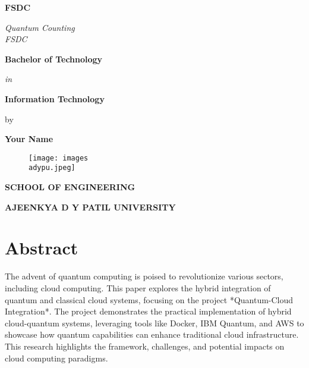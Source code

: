 \documentclass[12pt,a4paper]{article}
\newcommand{\mydegree}{Bachelor of Technology} %
\newcommand{\degreename}{Information Technology} %
\newcommand{\mysupervisor}{Your Name} %
\newcommand{\mydep}{School of Engineering}
\begin{document}
\thispagestyle{empty}
\begin{center}
    {\large {\bfseries FSDC} \par}
    \vspace{3\baselineskip}
    {\textit{Quantum Counting}\\
    \textit{FSDC}}\par
    \vspace{\baselineskip}
    {\large \bf \mydegree \par} 
    \vspace{\baselineskip}
    {\textit{in} \par}
    \vspace{\baselineskip}
    {{\large {\bf \degreename \\ }} \par}
    \vspace{1.5\baselineskip}
    {by \par}
    \vspace{\baselineskip}
    {{\large \bf \mysupervisor} \par}
    \vspace{1.5\baselineskip}
    {\begin{figure}[!h]
        \centering
        \texttt{[image: images\\adypu.jpeg]} %
    \end{figure}}
    \vspace{1.5\baselineskip}
    {\bf \MakeUppercase{\mydep} \par}
    \vspace{1ex}
    {\bf \uppercase{Ajeenkya D Y Patil University} \par}
\end{center}

\newpage

\section*{Abstract}
The advent of quantum computing is poised to revolutionize various sectors, including cloud computing. This paper explores the hybrid integration of quantum and classical cloud systems, focusing on the project *Quantum-Cloud Integration*. The project demonstrates the practical implementation of hybrid cloud-quantum systems, leveraging tools like Docker, IBM Quantum, and AWS to showcase how quantum capabilities can enhance traditional cloud infrastructure. This research highlights the framework, challenges, and potential impacts on cloud computing paradigms.
\end{document}
